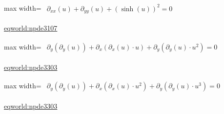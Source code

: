 \documentclass[10pt,a4paper]{article}
\begin{document}
\begin{minipage}{\linewidth}
\begin{center}\begin{adjustbox}{max width=\linewidth}$\displaystyle\begin{gathered}\begin{gathered}\partial_{xx}(u)+\partial_{yy}(u)+(\sinh(u))^{2}=0\end{gathered}\end{gathered}$\end{adjustbox}\end{center}
{\small \href{https://eqworld.ipmnet.ru/en/solutions/npde/npde3107.pdf}{eqworld:npde3107}}\par
\end{minipage}\par\vspace{7mm}

\begin{minipage}{\linewidth}
\begin{center}\begin{adjustbox}{max width=\linewidth}$\displaystyle\begin{gathered}\begin{gathered}\partial_{y}(\partial_{y}(u))+\partial_{x}(\partial_{x}(u)\cdot u)+\partial_{y}(\partial_{y}(u)\cdot u^{2})=0\end{gathered}\end{gathered}$\end{adjustbox}\end{center}
{\small \href{https://eqworld.ipmnet.ru/en/solutions/npde/npde3303.pdf}{eqworld:npde3303}}\par
\end{minipage}\par\vspace{7mm}

\begin{minipage}{\linewidth}
\begin{center}\begin{adjustbox}{max width=\linewidth}$\displaystyle\begin{gathered}\begin{gathered}\partial_{y}(\partial_{y}(u))+\partial_{x}(\partial_{x}(u)\cdot u^{2})+\partial_{y}(\partial_{y}(u)\cdot u^{3})=0\end{gathered}\end{gathered}$\end{adjustbox}\end{center}
{\small \href{https://eqworld.ipmnet.ru/en/solutions/npde/npde3303.pdf}{eqworld:npde3303}}\par
\end{minipage}\par\vspace{7mm}
\end{document}
